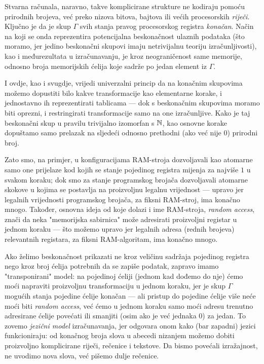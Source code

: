 Stvarna računala, naravno, takve komplicirane strukture ne kodiraju pomoću prirodnih brojeva, već preko nizova bitova, bajtova ili većih procesorskih \emph{riječi}. Ključno je da je skup $\Gamma$ svih stanja pravog procesorskog registra \emph{konačan}. Način na koji se onda reprezentira potencijalna beskonačnost ulaznih podataka (što moramo, jer jedino beskonačni skupovi imaju netrivijalnu teoriju izračunljivosti), kao i međurezultata u izračunavanju, je kroz neograničenost same memorije, odnosno broja memorijskih ćelija koje sadrže po jedan element iz $\Gamma$.

I ovdje, kao i svugdje, vrijedi univerzalni princip da na konačnim skupovima možemo dopustiti bilo kakve transformacije kao elementarne korake, i jednostavno ih reprezentirati tablicama --- dok s beskonačnim skupovima moramo biti oprezni, i restringirati transformacije samo na one izračunljive. Kako je taj beskonačni skup u pravilu trivijalno izomorfan s ${\mathbb N}$, kao osnovne korake dopuštamo samo prelazak na sljedeći odnosno prethodni (ako već nije $0$) prirodni broj.

Zato smo, na primjer, u konfiguracijama RAM-stroja dozvoljavali kao atomarne samo one prijelaze kod kojih se stanje pojedinog registra mijenja za najviše $1$ u svakom koraku; dok smo za stanje programskog brojača dozvoljavali atomarne skokove u kojima se postavlja na proizvoljnu legalnu vrijednost --- upravo jer legalnih vrijednosti programskog brojača, za fiksni RAM-stroj, ima konačno mnogo. Također, osnovna ideja od koje dolazi i ime RAM-stroja, \emph{random access}, znači da neka "memorijska sabirnica" može adresirati proizvoljni registar u jednom koraku --- što možemo upravo jer legalnih adresa (rednih brojeva) relevantnih registara, za fiksni RAM-algoritam, ima konačno mnogo.

Ako želimo beskonačnost prikazati ne kroz veličinu sadržaja pojedinog registra nego kroz broj ćelija potrebnih da se zapiše podatak, zapravo imamo "transponirani" model: na pojedinoj ćeliji (jednom kad dođemo do nje) ćemo moći napraviti proizvoljnu transformaciju u jednom koraku, jer je skup $\Gamma$ mogućih stanja pojedine ćelije konačan --- ali pristup do pojedine ćelije više neće moći biti \emph{random access}, već ćemo u jednom koraku samo moći adresu trenutno adresirane ćelije povećati ili smanjiti (osim ako je već jednaka $0$) za jedan. To zovemo \emph{jezični model} izračunavanja, jer odgovara onom kako (bar zapadni) jezici funkcioniraju: od konačnog broja slova u abecedi nizanjem možemo dobiti proizvoljno komplicirane riječi, rečenice i tekstove. Da bismo povećali izražajnost, ne uvodimo nova slova, već pišemo dulje rečenice.

